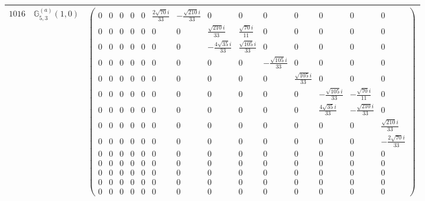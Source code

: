 \documentclass[fleqn,8pt,landscape]{jsarticle}
\begin{document}
\begin{center}
\begin{longtable}{ccc}
$ 1016 $ & $ \mathbb{G}_{5,3}^{(a)}(1,0) $ & $ \begin{pmatrix} 0 & 0 & 0 & 0 & 0 & \frac{2 \sqrt{70} i}{33} & - \frac{\sqrt{210} i}{33} & 0 & 0 & 0 & 0 & 0 & 0 & 0 \\ 0 & 0 & 0 & 0 & 0 & 0 & 0 & \frac{\sqrt{210} i}{33} & \frac{\sqrt{70} i}{11} & 0 & 0 & 0 & 0 & 0 \\ 0 & 0 & 0 & 0 & 0 & 0 & 0 & - \frac{4 \sqrt{35} i}{33} & \frac{\sqrt{105} i}{33} & 0 & 0 & 0 & 0 & 0 \\ 0 & 0 & 0 & 0 & 0 & 0 & 0 & 0 & 0 & - \frac{\sqrt{105} i}{33} & 0 & 0 & 0 & 0 \\ 0 & 0 & 0 & 0 & 0 & 0 & 0 & 0 & 0 & 0 & \frac{\sqrt{105} i}{33} & 0 & 0 & 0 \\ 0 & 0 & 0 & 0 & 0 & 0 & 0 & 0 & 0 & 0 & 0 & - \frac{\sqrt{105} i}{33} & - \frac{\sqrt{70} i}{11} & 0 \\ 0 & 0 & 0 & 0 & 0 & 0 & 0 & 0 & 0 & 0 & 0 & \frac{4 \sqrt{35} i}{33} & - \frac{\sqrt{210} i}{33} & 0 \\ 0 & 0 & 0 & 0 & 0 & 0 & 0 & 0 & 0 & 0 & 0 & 0 & 0 & \frac{\sqrt{210} i}{33} \\ 0 & 0 & 0 & 0 & 0 & 0 & 0 & 0 & 0 & 0 & 0 & 0 & 0 & - \frac{2 \sqrt{70} i}{33} \\ 0 & 0 & 0 & 0 & 0 & 0 & 0 & 0 & 0 & 0 & 0 & 0 & 0 & 0 \\ 0 & 0 & 0 & 0 & 0 & 0 & 0 & 0 & 0 & 0 & 0 & 0 & 0 & 0 \\ 0 & 0 & 0 & 0 & 0 & 0 & 0 & 0 & 0 & 0 & 0 & 0 & 0 & 0 \\ 0 & 0 & 0 & 0 & 0 & 0 & 0 & 0 & 0 & 0 & 0 & 0 & 0 & 0 \\ 0 & 0 & 0 & 0 & 0 & 0 & 0 & 0 & 0 & 0 & 0 & 0 & 0 & 0 \end{pmatrix} $ \\ \hline

\end{longtable}
\end{center}
\end{document}
